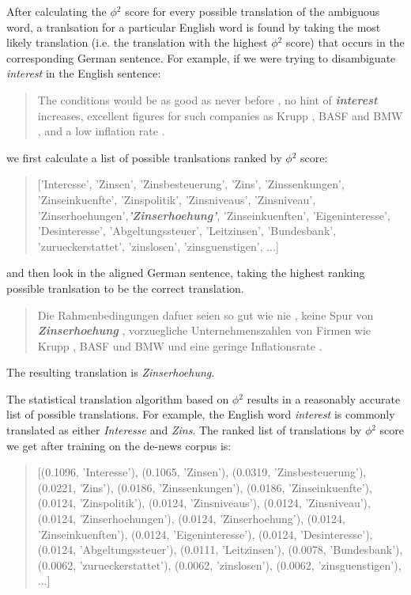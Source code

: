 \documentclass[a4wide,10pt]{article}
\begin{document}
After calculating the $\phi$$^2$ score for every possible translation of the
ambiguous word, a tranlsation for a particular English word is found by 
taking the most likely translation (i.e. the translation with the 
highest $\phi$$^2$ score) that occurs in the corresponding German sentence. 
For example, if we were trying to disambiguate {\it interest} in the English 
sentence:  
\begin{quote}
The conditions would be as good as never before , no hint of 
{\bf \em interest} increases, excellent figures for such companies as Krupp 
, BASF and BMW , and a low inflation rate .
\end{quote}

\noindent we first calculate a list of possible tranlsations ranked by 
$\phi$$^2$ score: 

\begin{quote}
['Interesse', 'Zinsen', 'Zinsbesteuerung', 'Zins', 'Zinssenkungen', 
'Zinseinkuenfte', 'Zinspolitik', 'Zinsniveaus', 'Zinsniveau', 
'Zinserhoehungen',{\bf \em 'Zinserhoehung'}, 'Zinseinkuenften', 
'Eigeninteresse', 'Desinteresse', 'Abgeltungssteuer', 'Leitzinsen', 
'Bundesbank', 'zurueckerstattet', 'zinslosen', 'zinsguenstigen', ...]
\end{quote}

\noindent and then look in the aligned German sentence, taking the highest 
ranking possible tranlsation to be the correct translation. 

\begin{quote}
Die Rahmenbedingungen dafuer seien so gut wie nie , keine Spur 
von {\bf \em Zinserhoehung} , vorzuegliche Unternehmenszahlen von Firmen 
wie Krupp , BASF und BMW und eine geringe Inflationsrate .
\end{quote}

\noindent The resulting translation is {\it Zinserhoehung}. 

The statistical translation algorithm based on $\phi$$^2$ results in a 
reasonably accurate list of possible translations. For example, the English 
word {\it interest} is commonly translated as either {\it Interesse} and 
{\it Zins}. The ranked list of translations by $\phi$$^2$ score we get after
training on the de-news corpus is: 

\begin{quote}
[(0.1096, 'Interesse'), (0.1065, 'Zinsen'), 
(0.0319, 'Zinsbesteuerung'), (0.0221, 'Zins'), 
(0.0186, 'Zinssenkungen'), 
(0.0186, 'Zinseinkuenfte'), (0.0124, 'Zinspolitik'),
(0.0124, 'Zinsniveaus'), (0.0124, 'Zinsniveau'), 
(0.0124, 'Zinserhoehungen'), 
(0.0124, 'Zinserhoehung'), 
(0.0124, 'Zinseinkuenften'), 
(0.0124, 'Eigeninteresse'), 
(0.0124, 'Desinteresse'), 
(0.0124, 'Abgeltungssteuer'), 
(0.0111, 'Leitzinsen'), 
(0.0078, 'Bundesbank'), 
(0.0062, 'zurueckerstattet'), 
(0.0062, 'zinslosen'), 
(0.0062, 'zinsguenstigen'), ...]
\end{quote}
\end{document}

